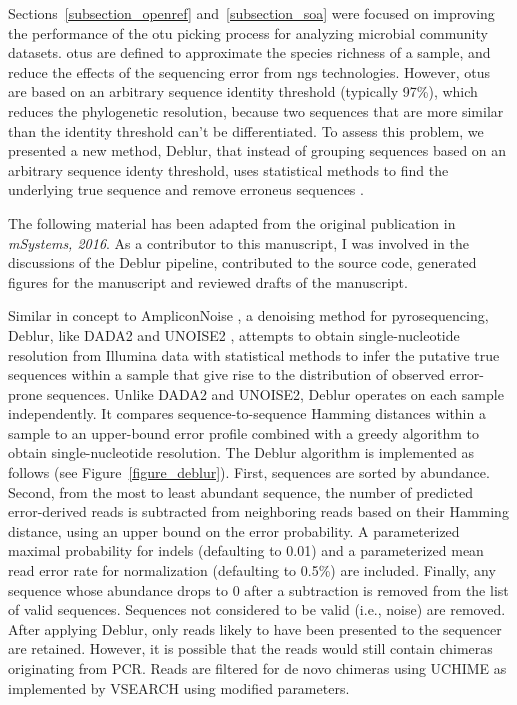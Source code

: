 Sections~\ref{subsection_openref} and~\ref{subsection_soa} were focused on
improving the performance of the \gls{otu} picking process for analyzing
microbial community datasets. \gls{otu}s are defined to approximate the species
richness of a sample, and reduce the effects of the sequencing error from \gls{ngs}
technologies. However, \gls{otu}s are based on an arbitrary sequence identity
threshold (typically 97\%), which reduces the phylogenetic resolution, because two
sequences that are more similar than the identity threshold can't be differentiated.
To assess this problem, we presented a new method, Deblur, that instead of grouping
sequences based on an arbitrary sequence identy threshold, uses statistical
methods to find the underlying true sequence and remove erroneus sequences \cite{Amir2017}.

The following material has been adapted from the original publication in
\textsl{mSystems, 2016}. As a contributor to this manuscript, I was involved in
the discussions of the Deblur pipeline, contributed to the source code, generated
figures for the manuscript and reviewed drafts of the manuscript.

Similar in concept to AmpliconNoise \cite{Quince2011}, a denoising method for
pyrosequencing, Deblur, like DADA2 \cite{Callahan2016} and UNOISE2 \cite{Edgar2016},
attempts to obtain single-nucleotide resolution from Illumina data with
statistical methods to infer the putative true sequences within a sample that
give rise to the distribution of observed error-prone sequences. Unlike DADA2 and
UNOISE2, Deblur operates on each sample independently. It compares
sequence-to-sequence Hamming distances within a sample to an upper-bound error
profile combined with a greedy algorithm to obtain single-nucleotide resolution.
The Deblur algorithm is implemented as follows (see Figure~\ref{figure_deblur}).
First, sequences are sorted by abundance. Second, from the most to least
abundant sequence, the number of predicted error-derived reads is subtracted
from neighboring reads based on their Hamming distance, using an upper bound on
the error probability. A parameterized maximal probability for indels
(defaulting to 0.01) and a parameterized mean read error rate for normalization
(defaulting to 0.5\%) are included. Finally, any sequence whose abundance drops
to 0 after a subtraction is removed from the list of valid sequences. Sequences
not considered to be valid (i.e., noise) are removed. After applying Deblur,
only reads likely to have been presented to the sequencer are retained.
However, it is possible that the reads would still contain chimeras originating
from PCR. Reads are filtered for de novo chimeras using UCHIME \cite{Edgar2011}
as implemented by VSEARCH \cite{Rognes2016} using modified parameters.

